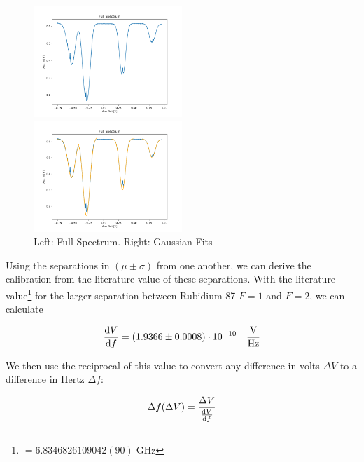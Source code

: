 \documentclass[12pt, a4paper]{article}
\begin{document}
\begin{figure}
    \centering
    \parbox{0.45\textwidth}{
        \includegraphics[width=0.5\textwidth]{fullspectrum.png}
    }
    \hfill
    \parbox{0.45\textwidth}{
        \includegraphics[width=0.5\textwidth]{fullspectrumgaussian}    
    }
    \caption{Left: Full Spectrum. Right: Gaussian Fits}
\end{figure}

Using the separations in $(\mu \pm \sigma)$ from one another, we can derive the calibration from the literature value of these separations. With the literature value\footnote{$= 6.8346826109042(90)\;\si{\giga\hertz}$} for the larger separation between Rubidium 87 $F = 1$ and $F = 2$, we can calculate

\begin{equation}
\dv{V}{f} = (1.9366 \pm 0.0008) \cdot 10^{-10} \quad \si{\frac{\volt}{\hertz}}
\end{equation}

We then use the reciprocal of this value to convert any difference in volts $\Delta V$ to a difference in Hertz $\Delta f$:

\begin{equation}
\Delta f (\Delta V) = \frac{\Delta V}{\dv{V}{f}}
\end{equation}







\newpage
\end{document}
